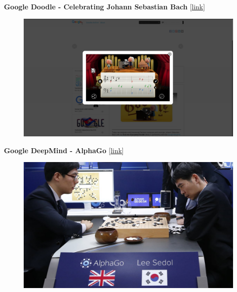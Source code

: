 \documentclass[10pt, compress]{beamer}
\begin{document}
\begin{frame}
  \vspace{.6cm}
  \textbf{Google Doodle - Celebrating Johann Sebastian Bach} [\href{https://www.google.com/doodles/celebrating-johann-sebastian-bach}{link}] \\

  \vspace{.6cm}
  \begin{figure}
    \includegraphics[width=.9\linewidth]{imgs/news/doodle}
  \end{figure}
\end{frame}

\begin{frame}
  \vspace{.6cm}
  \textbf{Google DeepMind - AlphaGo} [\href{https://deepmind.com/research/alphago/}{link}] \\

  \vspace{.6cm}
  \begin{figure}
    \includegraphics[width=.9\linewidth]{imgs/news/alphago}
  \end{figure}
\end{frame}
\end{document}
